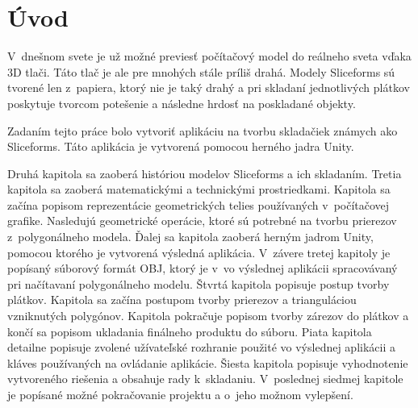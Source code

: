 
\chapter{Úvod}

V~dnešnom svete je už možné previesť počítačový model do reálneho sveta vďaka 3D tlači. Táto tlač je ale pre mnohých stále príliš drahá. Modely Sliceforms sú tvorené len z~papiera, ktorý nie je taký drahý a pri skladaní jednotlivých plátkov poskytuje tvorcom potešenie a následne hrdosť na poskladané objekty.

Zadaním tejto práce bolo vytvoriť aplikáciu na tvorbu skladačiek známych ako Sliceforms. Táto aplikácia je vytvorená pomocou herného jadra Unity. 

Druhá kapitola sa zaoberá históriou modelov Sliceforms a ich skladaním. 
Tretia kapitola sa zaoberá matematickými a technickými prostriedkami. Kapitola sa začína popisom reprezentácie geometrických telies používaných v~počítačovej grafike. Nasledujú geometrické operácie, ktoré sú potrebné na tvorbu prierezov z~polygonálneho modela. Ďalej sa kapitola zaoberá herným jadrom Unity, pomocou ktorého je vytvorená výsledná aplikácia. V~závere tretej kapitoly je popísaný súborový formát OBJ, ktorý je v~vo výslednej aplikácii spracovávaný pri načítavaní polygonálneho modelu.
Štvrtá kapitola popisuje postup tvorby plátkov. Kapitola sa začína postupom tvorby prierezov a trianguláciou vzniknutých polygónov. Kapitola pokračuje popisom tvorby zárezov do plátkov a končí sa popisom ukladania finálneho produktu do súboru.
Piata kapitola detailne popisuje zvolené užívateľské rozhranie použité vo výslednej aplikácii a kláves používaných na ovládanie aplikácie.
Šiesta kapitola popisuje vyhodnotenie vytvoreného riešenia a obsahuje rady k~skladaniu.
V~poslednej siedmej kapitole je popísané možné pokračovanie projektu a o~jeho možnom vylepšení.



